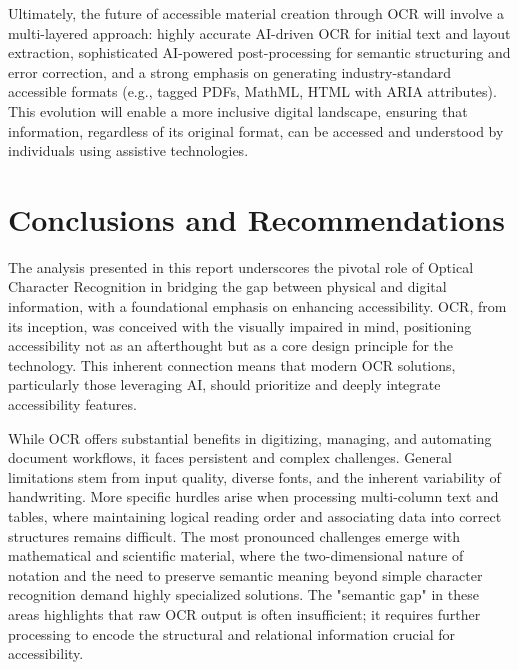 Ultimately, the future of accessible material creation through OCR will involve a multi-layered approach: highly accurate AI-driven OCR for initial text and layout extraction, sophisticated AI-powered post-processing for semantic structuring and error correction, and a strong emphasis on generating industry-standard accessible formats (e.g., tagged PDFs, MathML, HTML with ARIA attributes). This evolution will enable a more inclusive digital landscape, ensuring that information, regardless of its original format, can be accessed and understood by individuals using assistive technologies.

\section{Conclusions and Recommendations}
\label{sec:ocr-conclusions}

\vspace{1em}

The analysis presented in this report underscores the pivotal role of Optical Character Recognition in bridging the gap between physical and digital information, with a foundational emphasis on enhancing accessibility. OCR, from its inception, was conceived with the visually impaired in mind, positioning accessibility not as an afterthought but as a core design principle for the technology. This inherent connection means that modern OCR solutions, particularly those leveraging AI, should prioritize and deeply integrate accessibility features.

While OCR offers substantial benefits in digitizing, managing, and automating document workflows, it faces persistent and complex challenges. General limitations stem from input quality, diverse fonts, and the inherent variability of handwriting. More specific hurdles arise when processing multi-column text and tables, where maintaining logical reading order and associating data into correct structures remains difficult. The most pronounced challenges emerge with mathematical and scientific material, where the two-dimensional nature of notation and the need to preserve semantic meaning beyond simple character recognition demand highly specialized solutions. The "semantic gap" in these areas highlights that raw OCR output is often insufficient; it requires further processing to encode the structural and relational information crucial for accessibility.

